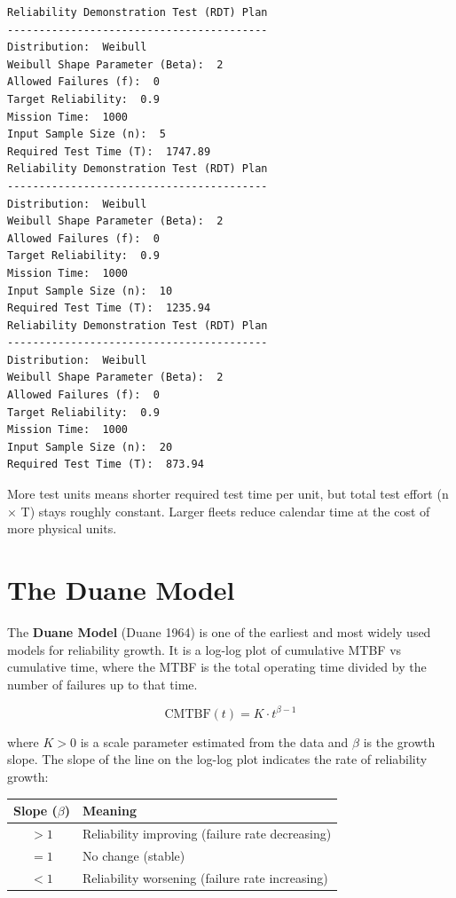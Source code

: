 \documentclass[
  letterpaper,
  DIV=11,
  numbers=noendperiod]{scrreprt}
\newcounter{none} %
\begin{document}
\begin{tcolorbox}
\begin{verbatim}
Reliability Demonstration Test (RDT) Plan
-----------------------------------------
Distribution:  Weibull 
Weibull Shape Parameter (Beta):  2 
Allowed Failures (f):  0 
Target Reliability:  0.9 
Mission Time:  1000 
Input Sample Size (n):  5 
Required Test Time (T):  1747.89 
Reliability Demonstration Test (RDT) Plan
-----------------------------------------
Distribution:  Weibull 
Weibull Shape Parameter (Beta):  2 
Allowed Failures (f):  0 
Target Reliability:  0.9 
Mission Time:  1000 
Input Sample Size (n):  10 
Required Test Time (T):  1235.94 
Reliability Demonstration Test (RDT) Plan
-----------------------------------------
Distribution:  Weibull 
Weibull Shape Parameter (Beta):  2 
Allowed Failures (f):  0 
Target Reliability:  0.9 
Mission Time:  1000 
Input Sample Size (n):  20 
Required Test Time (T):  873.94 
\end{verbatim}

More test units means shorter required test time per unit, but total
test effort (n × T) stays roughly constant. Larger fleets reduce
calendar time at the cost of more physical units.

\end{tcolorbox}

\section{The Duane Model}\label{the-duane-model}

The \textbf{Duane Model} (Duane 1964) is one of the earliest and most
widely used models for reliability growth. It is a log-log plot of
cumulative MTBF vs cumulative time, where the MTBF is the total
operating time divided by the number of failures up to that time.

\[\text{CMTBF}(t) = K \cdot t^{\beta - 1}\]

where \(K > 0\) is a scale parameter estimated from the data and
\(\beta\) is the growth slope. The slope of the line on the log-log plot
indicates the rate of reliability growth:

{\def\LTcaptype{none} %
\begin{longtable}[]{@{}cl@{}}
\toprule\noalign{}
Slope (\(\beta\)) & Meaning \\
\midrule\noalign{}
\endhead
\bottomrule\noalign{}
\endlastfoot
\(> 1\) & Reliability improving (failure rate decreasing) \\
\(= 1\) & No change (stable) \\
\(< 1\) & Reliability worsening (failure rate increasing) \\
\end{longtable}
}
\end{document}
